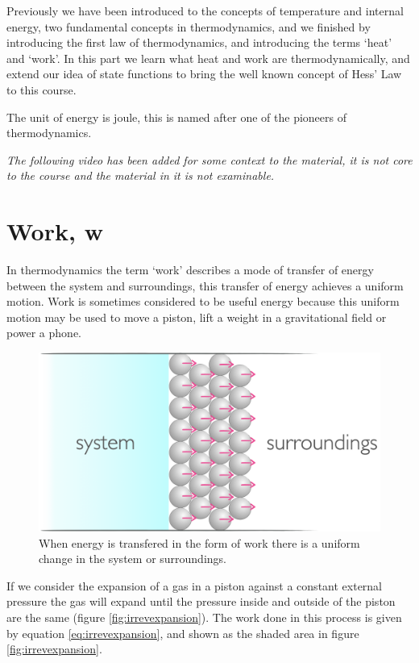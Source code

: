 \documentclass[
]{book}
\begin{document}
Previously we have been introduced to the concepts of temperature and internal energy, two fundamental concepts in thermodynamics, and we finished by introducing the first law of thermodynamics, and introducing the terms `heat' and `work'. In this part we learn what heat and work are thermodynamically, and extend our idea of state functions to bring the well known concept of Hess' Law to this course.

The unit of energy is joule, this is named after one of the pioneers of thermodynamics.

\emph{The following video has been added for some context to the material, it is not core to the course and the material in it is not examinable.}

\hypertarget{sec:work}{%
\section{Work, w}\label{sec:work}}

In thermodynamics the term `work' describes a mode of transfer of energy between the system and surroundings, this transfer of energy achieves a uniform motion. Work is sometimes considered to be useful energy because this uniform motion may be used to move a piston, lift a weight in a gravitational field or power a phone.

\begin{figure}

{\centering \includegraphics[width=0.5\linewidth]{images/work} 

}

\caption{When energy is transfered in the form of work there is a uniform change in the system or surroundings.}\label{fig:work}
\end{figure}

If we consider the expansion of a gas in a piston against a constant external pressure the gas will expand until the pressure inside and outside of the piston are the same (figure \ref{fig:irrevexpansion}). The work done in this process is given by equation \eqref{eq:irrevexpansion}, and shown as the shaded area in figure \ref{fig:irrevexpansion}.
\end{document}
